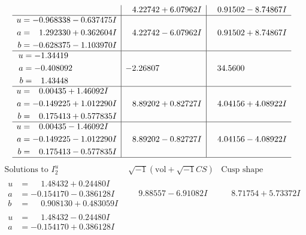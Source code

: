 \documentclass[1p]{elsarticle_modified}
\theoremstyle{definition}
\newcommand{\I}{\sqrt{-1}}
\begin{document}
$$\begin{array}{c|c|c}
 & \phantom{-}4.22742 + 6.07962 I & \phantom{-}0.91502 - 8.74867 I \\ \hline\begin{aligned}
u &= -0.968338 - 0.637475 I \\
a &= \phantom{-}1.292330 + 0.362604 I \\
b &= -0.628375 - 1.103970 I\end{aligned}
 & \phantom{-}4.22742 - 6.07962 I & \phantom{-}0.91502 + 8.74867 I \\ \hline\begin{aligned}
u &= -1.34419\phantom{ +0.000000I} \\
a &= -0.408092\phantom{ +0.000000I} \\
b &= \phantom{-}1.43448\phantom{ +0.000000I}\end{aligned}
 & -2.26807\phantom{ +0.000000I} & \phantom{-}34.5600\phantom{ +0.000000I} \\ \hline\begin{aligned}
u &= \phantom{-}0.00435 + 1.46092 I \\
a &= -0.149225 + 1.012290 I \\
b &= \phantom{-}0.175413 + 0.577835 I\end{aligned}
 & \phantom{-}8.89202 + 0.82727 I & \phantom{-}4.04156 + 4.08922 I \\ \hline\begin{aligned}
u &= \phantom{-}0.00435 - 1.46092 I \\
a &= -0.149225 - 1.012290 I \\
b &= \phantom{-}0.175413 - 0.577835 I\end{aligned}
 & \phantom{-}8.89202 - 0.82727 I & \phantom{-}4.04156 - 4.08922 I\\
 \hline 
 \end{array}$$\newpage$$\begin{array}{c|c|c}  
\text{Solutions to }I^u_{2}& \I (\text{vol} + \sqrt{-1}CS) & \text{Cusp shape}\\
 \hline 
\begin{aligned}
u &= \phantom{-}1.48432 + 0.24480 I \\
a &= -0.154170 - 0.386128 I \\
b &= \phantom{-}0.908130 + 0.483059 I\end{aligned}
 & \phantom{-}9.88557 - 6.91082 I & \phantom{-}8.71754 + 5.73372 I \\ \hline\begin{aligned}
u &= \phantom{-}1.48432 - 0.24480 I \\
a &= -0.154170 + 0.386128 I \\

\end{aligned}
\end{array}$$
\end{document}
